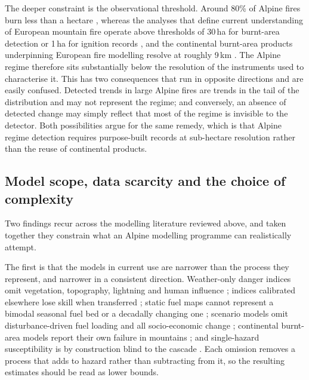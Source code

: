 \documentclass[11pt,a4paper]{article}
\begin{document}
The deeper constraint is the observational threshold. Around 80\% of Alpine fires burn less than a hectare \citep{muller_forest_2020}, whereas the analyses that define current understanding of European mountain fire operate above thresholds of 30\,ha for burnt-area detection \citep{beloiu_climatedriven_2026} or 1\,ha for ignition records \citep{gelabert_assessing_2025}, and the continental burnt-area products underpinning European fire modelling resolve at roughly 9\,km \citep{forrest_understanding_2024}. The Alpine regime therefore sits substantially below the resolution of the instruments used to characterise it. This has two consequences that run in opposite directions and are easily confused. Detected trends in large Alpine fires are trends in the tail of the distribution and may not represent the regime; and conversely, an absence of detected change may simply reflect that most of the regime is invisible to the detector. Both possibilities argue for the same remedy, which is that Alpine regime detection requires purpose-built records at sub-hectare resolution rather than the reuse of continental products.

\subsection{Model scope, data scarcity and the choice of complexity}
\label{sec:complexity}

Two findings recur across the modelling literature reviewed above, and taken together they constrain what an Alpine modelling programme can realistically attempt.

The first is that the models in current use are narrower than the process they represent, and narrower in a consistent direction. Weather-only danger indices omit vegetation, topography, lightning and human influence \citep{muller_towards_2020}; indices calibrated elsewhere lose skill when transferred \citep{de_angelis_modelling_2015, gelabert_assessing_2025}; static fuel maps cannot represent a bimodal seasonal fuel bed or a decadally changing one \citep{bebi_changes_2017, frei_evidence_2023}; scenario models omit disturbance-driven fuel loading and all socio-economic change \citep{gerberding_mapping_2025}; continental burnt-area models report their own failure in mountains \citep{forrest_understanding_2024}; and single-hazard susceptibility is by construction blind to the cascade \citep{trucchia_defining_2022}. Each omission removes a process that adds to hazard rather than subtracting from it, so the resulting estimates should be read as lower bounds.
\end{document}
